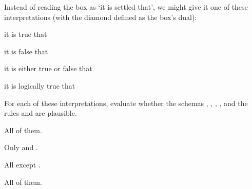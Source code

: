 \begin{exercise}
  Instead of reading the box as `it is settled that', we might give it one of these interpretations (with the diamond defined as the box's dual):
  \begin{exlist}
    \item it is true that
    \item it is false that
    \item it is either true or false that
    \item it is logically true that
  \end{exlist}
  \medskip\noindent%
  For each of these interpretations, evaluate whether the schemas , , , , and the rules  and  are plausible. 
\end{exercise}
\begin{solution}
  \begin{sollist}
  \item All of them.
  \item Only  and .
  \item All except .
  \item All of them.




\end{sollist}
\end{solution}
